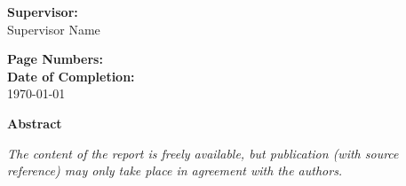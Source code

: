 \begin{singlespace}
\begin{minipage}[t]{0.48\textwidth}
    \textbf{Supervisor:} \\[5pt]\hspace*{2ex}
    Supervisor Name
    
    \vspace*{0.5cm}
    
    \textbf{Page Numbers:} \pageref{bib:mybiblio} \\
    
    \textbf{Date of Completion:} \\[5pt]\hspace*{2ex}
    \today
\end{minipage}
\hfill
\begin{minipage}[t]{0.483\textwidth}
    \textbf{Abstract} \\[5pt]
    \fbox{\parbox{7cm}{\bigskip\small{\bigskip}}}
\end{minipage}

\vfill

{\scriptsize\itshape The content of the report is freely available, but publication (with source reference) may only take place in agreement with the authors.}

\end{singlespace}
